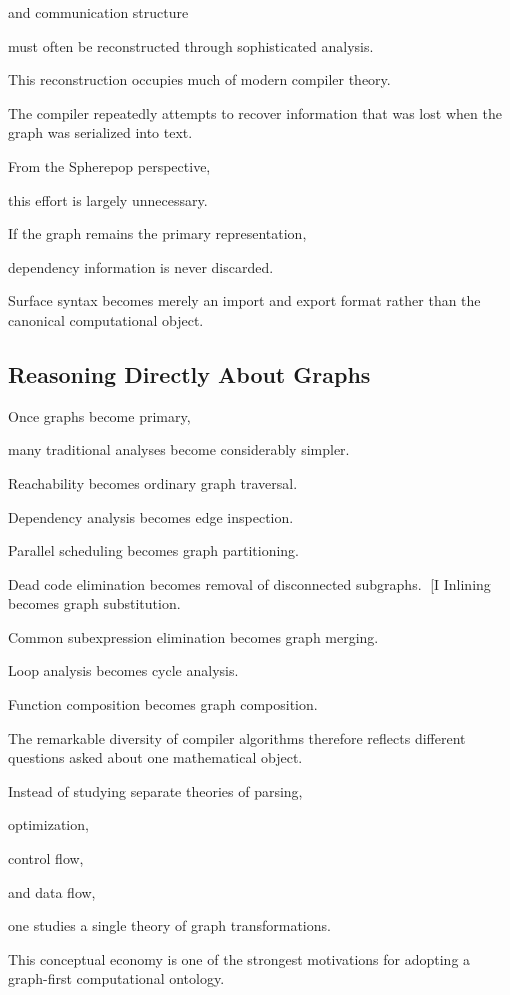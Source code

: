 \documentclass[12pt,oneside]{article}
\begin{document}
and communication structure

must often be reconstructed through sophisticated analysis.

This reconstruction occupies much of modern compiler theory.

The compiler repeatedly attempts to recover information that was lost when the graph was serialized into text.

From the Spherepop perspective,

this effort is largely unnecessary.

If the graph remains the primary representation,

dependency information is never discarded.

Surface syntax becomes merely an import and export format rather than the canonical computational object.

\subsection{Reasoning Directly About Graphs}

Once graphs become primary,

many traditional analyses become considerably simpler.

Reachability becomes ordinary graph traversal.

Dependency analysis becomes edge inspection.

Parallel scheduling becomes graph partitioning.

Dead code elimination becomes removal of disconnected subgraphs.
[I
Inlining becomes graph substitution.

Common subexpression elimination becomes graph merging.

Loop analysis becomes cycle analysis.

Function composition becomes graph composition.

The remarkable diversity of compiler algorithms therefore reflects different questions asked about one mathematical object.

Instead of studying separate theories of parsing,

optimization,

control flow,

and data flow,

one studies a single theory of graph transformations.

This conceptual economy is one of the strongest motivations for adopting a graph-first computational ontology.
\end{document}
